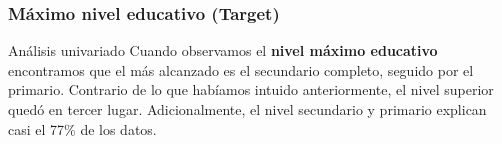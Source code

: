 \documentclass[pdf]{beamer}
\begin{document}
{%



           
           
           
 

           
           
           
           
    \subsubsection{Máximo nivel educativo (Target)}
    
\begin{frame}{Análisis univariado}
    Cuando observamos el \textbf{nivel máximo educativo} encontramos que el más alcanzado es el secundario completo, seguido por el primario. Contrario de lo que habíamos intuido anteriormente, el nivel superior quedó en tercer lugar. Adicionalmente, el nivel secundario y primario explican casi el 77\% de los datos.
  

\end{frame}}
\end{document}
